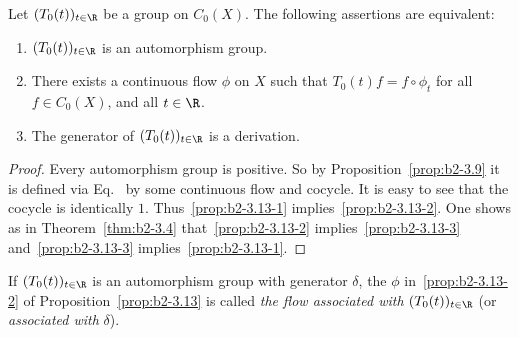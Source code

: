 \begin{proposition}\label{prop:b2-3.13}
Let $(T_{0}(t))_{t \in \R}$ be a group on $C_{0}(X)$.
The following assertions are equivalent:
\begin{enumerate}[\upshape (a)]
\item \label{prop:b2-3.13-1}
$(T_{0}(t))_{t \in \R}$ is an automorphism group.
\item \label{prop:b2-3.13-2}
There exists a continuous flow $\phi$ on $X$ such that $T_{0}(t)f = f \circ \phi_{t}$  for all \\
 $f \in C_{0}(X)$, and all $t \in \R$.
\item \label{prop:b2-3.13-3} 
The generator of\/ $(T_{0}(t))_{t \in \R}$ is a derivation.
\end{enumerate}
\end{proposition}
\begin{proof}
Every automorphism group is positive.
So by Proposition~\ref{prop:b2-3.9}  it is defined via Eq.~ by some continuous flow and cocycle.
It is easy to see that the cocycle is identically $1$.
Thus~\ref{prop:b2-3.13-1} implies~\ref{prop:b2-3.13-2}.
One shows as in Theorem~\ref{thm:b2-3.4}  that~\ref{prop:b2-3.13-2} implies~\ref{prop:b2-3.13-3} and~\ref{prop:b2-3.13-3} implies~\ref{prop:b2-3.13-1}.
\end{proof}
If\/ $(T_{0}(t))_{t \in \R}$ is an automorphism group with generator $\delta$, the $\phi$ in~\ref{prop:b2-3.13-2} of Proposition~\ref{prop:b2-3.13} is called \emph{the flow associated with} $(T_{0}(t))_{t \in \R}$ (or \emph{associated with} $\delta$).

